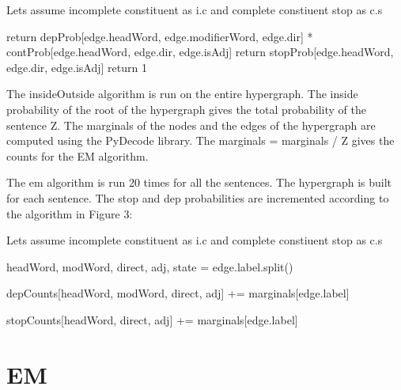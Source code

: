 \documentclass{article}
\begin{document}
\begin{algorithm}
  \label{Figure 2}
\begin{algorithmic}


\State Lets assume incomplete constituent as i.c and complete constiuent stop as c.s

   \State return depProb[edge.headWord, edge.modifierWord, edge.dir] * contProb[edge.headWord, edge.dir, edge.isAdj]
   \State return stopProb[edge.headWord, edge.dir, edge.isAdj]
\Else
   \State return 1
\EndIf

\end{algorithmic}
\end{algorithm}

 The insideOutside algorithm is run on the entire hypergraph. The inside probability of the root of the hypergraph gives the total probability of the sentence Z. The marginals of the nodes and the edges of the hypergraph are computed using the PyDecode library. The marginals = marginals / Z gives the counts for the EM algorithm.

The em algorithm is run 20 times for all the sentences. The hypergraph is built for each sentence. The stop and dep probabilities are incremented according to the algorithm in Figure 3:


\begin{algorithm}
  \label{Figure 3}
\begin{algorithmic}

\State Lets assume incomplete constituent as i.c and complete constiuent stop as c.s


   \State headWord, modWord, direct, adj, state = edge.label.split()

          \State depCounts[headWord, modWord, direct, adj] += marginals[edge.label]
        \EndIf

          \State stopCounts[headWord, direct, adj] += marginals[edge.label]
        \EndIf

\EndFor

\end{algorithmic}
\end{algorithm}

\section{EM}
\end{document}
